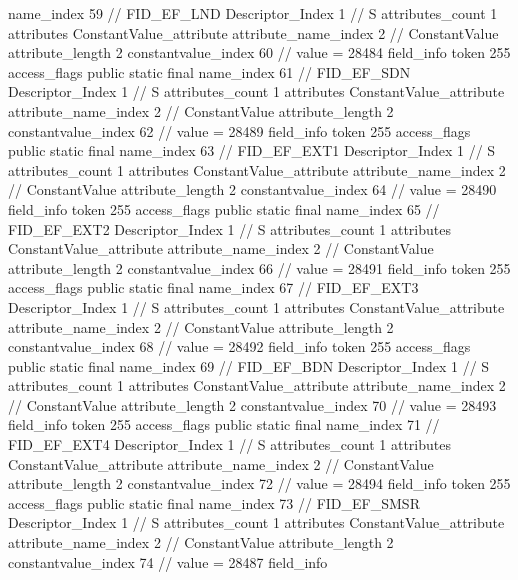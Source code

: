 {{{{{				name_index	59		// FID_EF_LND
				Descriptor_Index	1		// S
				attributes_count	1
				attributes {
				ConstantValue_attribute {
					attribute_name_index	2		// ConstantValue
					attribute_length	2
					constantvalue_index	60		// value = 28484
				}
				}
			}
			field_info {
				token	255
				access_flags	public static final
				name_index	61		// FID_EF_SDN
				Descriptor_Index	1		// S
				attributes_count	1
				attributes {
				ConstantValue_attribute {
					attribute_name_index	2		// ConstantValue
					attribute_length	2
					constantvalue_index	62		// value = 28489
				}
				}
			}
			field_info {
				token	255
				access_flags	public static final
				name_index	63		// FID_EF_EXT1
				Descriptor_Index	1		// S
				attributes_count	1
				attributes {
				ConstantValue_attribute {
					attribute_name_index	2		// ConstantValue
					attribute_length	2
					constantvalue_index	64		// value = 28490
				}
				}
			}
			field_info {
				token	255
				access_flags	public static final
				name_index	65		// FID_EF_EXT2
				Descriptor_Index	1		// S
				attributes_count	1
				attributes {
				ConstantValue_attribute {
					attribute_name_index	2		// ConstantValue
					attribute_length	2
					constantvalue_index	66		// value = 28491
				}
				}
			}
			field_info {
				token	255
				access_flags	public static final
				name_index	67		// FID_EF_EXT3
				Descriptor_Index	1		// S
				attributes_count	1
				attributes {
				ConstantValue_attribute {
					attribute_name_index	2		// ConstantValue
					attribute_length	2
					constantvalue_index	68		// value = 28492
				}
				}
			}
			field_info {
				token	255
				access_flags	public static final
				name_index	69		// FID_EF_BDN
				Descriptor_Index	1		// S
				attributes_count	1
				attributes {
				ConstantValue_attribute {
					attribute_name_index	2		// ConstantValue
					attribute_length	2
					constantvalue_index	70		// value = 28493
				}
				}
			}
			field_info {
				token	255
				access_flags	public static final
				name_index	71		// FID_EF_EXT4
				Descriptor_Index	1		// S
				attributes_count	1
				attributes {
				ConstantValue_attribute {
					attribute_name_index	2		// ConstantValue
					attribute_length	2
					constantvalue_index	72		// value = 28494
				}
				}
			}
			field_info {
				token	255
				access_flags	public static final
				name_index	73		// FID_EF_SMSR
				Descriptor_Index	1		// S
				attributes_count	1
				attributes {
				ConstantValue_attribute {
					attribute_name_index	2		// ConstantValue
					attribute_length	2
					constantvalue_index	74		// value = 28487
				}
				}
			}
			field_info {
}}}}}
